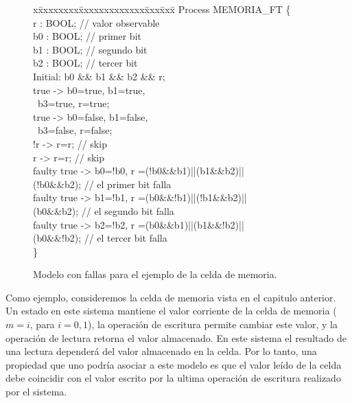 \begin{figure}[t]
\centering
\begin{minipage}[t]{.47\textwidth}
\fontsize{10}{10}\selectfont\ttfamily
\begin{tabbing}
x\=xxxxxxxx\=xxxxxxxxxxxxx\=xxx\=xxx\= \kill    
Process MEMORIA\_FT \{\\[1ex]
\>r : BOOL; // valor observable \\
\>b0 : BOOL; // primer bit \\
\>b1 : BOOL; // segundo bit \\
\>b2 : BOOL; // tercer bit \\[1ex]
\>Initial: b0 \&\& b1 \&\& b2 \&\& r;\\[1ex]
\>[write1]  true -> b0=true, b1=true,  \\
\>\>~b3=true, r=true; \>\> \\
\>[write0]  true -> b0=false, b1=false,  \\
\>\>~b3=false, r=false; \>\> \\
\>[read0]  !r -> r=r; // skip \\
\>[read1]  r ->  r=r; // skip \\
\>[fault1]  faulty true -> b0=!b0, r =(!b0\&\&b1)||(b1\&\&b2)|| \\ 
\>\>(!b0\&\&b2); // el primer bit falla  \\
\>[fault2]  faulty true -> b1=!b1, r =(b0\&\&!b1)||(!b1\&\&b2)|| \\ 
\>\>(b0\&\&b2); // el segundo bit falla  \\
\>[fault3]  faulty true -> b2=!b2, r =(b0\&\&b1)||(b1\&\&!b2)|| \\ 
\>\>(b0\&\&!b2); // el tercer bit falla  \\[1ex]
\}\\
\end{tabbing}
\end{minipage}
\caption{Modelo con fallas para el ejemplo de la celda de memoria.} \label{fig:exam_1_mem_cell_faulty}
\end{figure}

Como ejemplo, consideremos la celda de memoria vista en el capitulo anterior. 
Un estado en este sistema mantiene el valor corriente de la celda de memoria ($m=i$, para $i=0,1$), la operación de escritura permite cambiar este valor, y la operación de lectura retorna el valor almacenado.  
En este sistema el resultado de una lectura dependerá del valor almacenado en la celda. 
Por lo tanto, una propiedad que uno podría asociar a este modelo es que el valor leído de la celda debe coincidir con el valor escrito por la ultima operación de escritura realizado por el sistema. 
    

